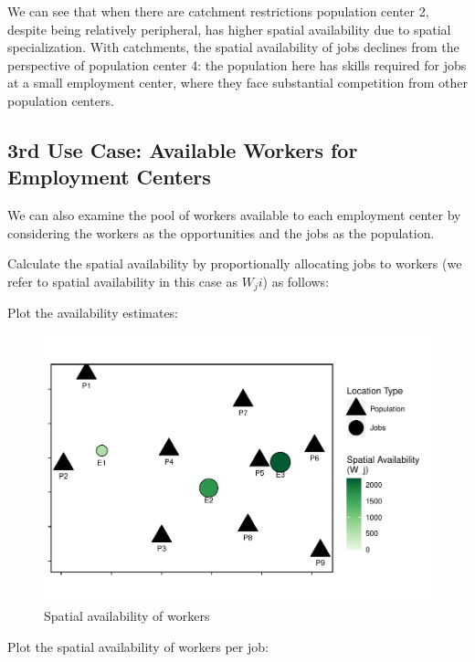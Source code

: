 \documentclass[]{elsarticle} %
\begin{document}
We can see that when there are catchment restrictions population center
2, despite being relatively peripheral, has higher spatial availability
due to spatial specialization. With catchments, the spatial availability
of jobs declines from the perspective of population center 4: the
population here has skills required for jobs at a small employment
center, where they face substantial competition from other population
centers.

\hypertarget{rd-use-case-available-workers-for-employment-centers}{%
\subsection{3rd Use Case: Available Workers for Employment
Centers}\label{rd-use-case-available-workers-for-employment-centers}}

We can also examine the pool of workers available to each employment
center by considering the workers as the opportunities and the jobs as
the population.

Calculate the spatial availability by proportionally allocating jobs to
workers (we refer to spatial availability in this case as \(W_ji\)) as
follows:

Plot the availability estimates:

\begin{figure}
\includegraphics[width=1\linewidth]{Spatial-Availability_files/figure-latex/toy-example-availability-workers-1} \caption{\label{fig:toy-example-availability-workers}Spatial availability of workers}\label{fig:toy-example-availability-workers}
\end{figure}

Plot the spatial availability of workers per job:
\end{document}
